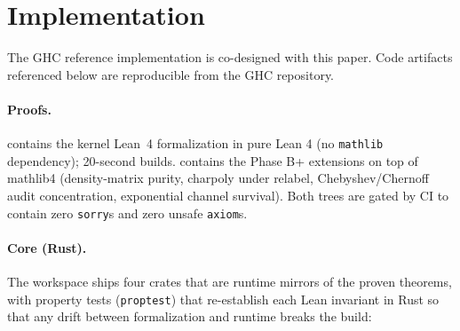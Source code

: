 \section{Implementation}
\label{sec:impl}

The GHC reference implementation is co-designed with this paper. Code
artifacts referenced below are reproducible from the GHC repository.

\paragraph{Proofs.}
 contains the kernel Lean~4 \cite{lean4} formalization
in pure Lean 4 (no \texttt{mathlib} dependency); 20-second builds.
 contains the Phase B+ extensions on top of
mathlib4 \cite{mathlib4} (density-matrix purity, charpoly under
relabel, Chebyshev/Chernoff audit concentration, exponential channel
survival). Both trees are gated by CI to contain zero \texttt{sorry}s
and zero unsafe \texttt{axiom}s.

\paragraph{Core (Rust).}
The  workspace ships four crates that are runtime mirrors
of the proven theorems, with property tests (\texttt{proptest}) that
re-establish each Lean invariant in Rust so that any drift between
formalization and runtime breaks the build:

